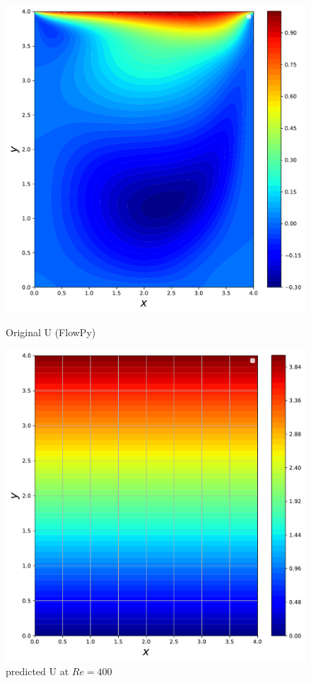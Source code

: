 \documentclass{article}
\begin{document}
\begin{figure}[htb!]
	\includegraphics[width=\linewidth]{./images/Re400FlowPy_u}
	\caption{Original U (FlowPy)}
	\label{fig:u_oigin}
	\endminipage\hfill

	\includegraphics[width=\linewidth]{./images/Re400BoxFlowNet_pred_u}
	\caption{predicted U at $Re = 400$}
	\label{fig:u_pred}
	\endminipage\hfill


\end{figure}
\end{document}
